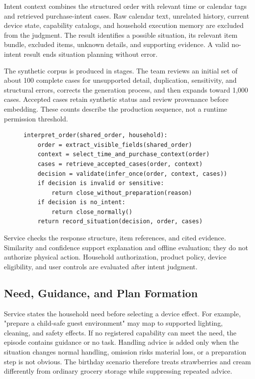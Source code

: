 \documentclass[conference]{IEEEtran}
\begin{document}
Intent context combines the structured order with relevant time or calendar tags and retrieved purchase-intent cases. Raw calendar text, unrelated history, current device state, capability catalogs, and household execution memory are excluded from the judgment. The result identifies a possible situation, its relevant item bundle, excluded items, unknown details, and supporting evidence. A valid no-intent result ends situation planning without error.

The synthetic corpus is produced in stages. The team reviews an initial set of about 100 complete cases for unsupported detail, duplication, sensitivity, and structural errors, corrects the generation process, and then expands toward 1,000 cases. Accepted cases retain synthetic status and review provenance before embedding. These counts describe the production sequence, not a runtime permission threshold.

\begin{figure}[!t]
\noindent\begin{minipage}{\columnwidth}
\begin{lstlisting}
interpret_order(shared_order, household):
    order = extract_visible_fields(shared_order)
    context = select_time_and_purchase_context(order)
    cases = retrieve_accepted_cases(order, context)
    decision = validate(infer_once(order, context, cases))
    if decision is invalid or sensitive:
        return close_without_preparation(reason)
    if decision is no_intent:
        return close_normally()
    return record_situation(decision, order, cases)
\end{lstlisting}
\end{minipage}
\end{figure}
Service checks the response structure, item references, and cited evidence. Similarity and confidence support explanation and offline evaluation; they do not authorize physical action. Household authorization, product policy, device eligibility, and user controls are evaluated after intent judgment.

\subsection{Need, Guidance, and Plan Formation}
Service states the household need before selecting a device effect. For example, "prepare a child-safe guest environment" may map to supported lighting, cleaning, and safety effects. If no registered capability can meet the need, the episode contains guidance or no task. Handling advice is added only when the situation changes normal handling, omission risks material loss, or a preparation step is not obvious. The birthday scenario therefore treats strawberries and cream differently from ordinary grocery storage while suppressing repeated advice.
\end{document}
